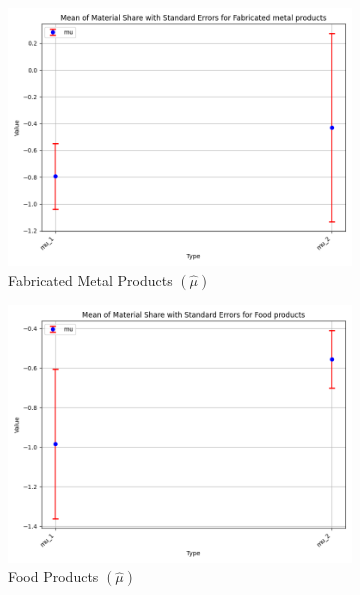 \documentclass{article}
\begin{document}
\begin{figure}[ht!]
    \begin{subfigure}[t]{0.32\textwidth}
        \centering
        \includegraphics[width=\textwidth]{figure/empirical_ar1_normal_kmshare_ciiu_mu_with_error_bars_Fabricated metal products.png}
        \caption{Fabricated Metal Products $(\hat\mu)$}
    \end{subfigure}
    \begin{subfigure}[t]{0.32\textwidth}
        \centering
        \includegraphics[width=\textwidth]{figure/empirical_ar1_normal_kmshare_ciiu_mu_with_error_bars_Food products.png}
        \caption{Food Products $(\hat\mu)$}
    \end{subfigure}
    \begin{subfigure}[t]{0.32\textwidth}

\end{subfigure}
\end{figure}
\end{document}
